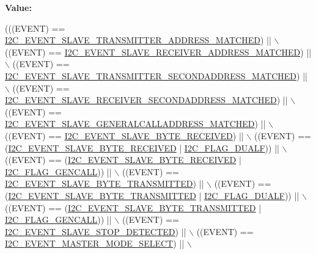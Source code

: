 {\bfseries Value\+:}
\begin{DoxyCode}
(((EVENT) == \hyperlink{group___i2_c___events_ga3fa381c1fd9a95c8ae13c6cc402b1327}{I2C\_EVENT\_SLAVE\_TRANSMITTER\_ADDRESS\_MATCHED}) || \(\backslash\)
                             ((EVENT) == 
      \hyperlink{group___i2_c___events_ga6cf0e334704618b024eee604849f50f7}{I2C\_EVENT\_SLAVE\_RECEIVER\_ADDRESS\_MATCHED}) || \(\backslash\)
                             ((EVENT) == 
      \hyperlink{group___i2_c___events_ga6221aa204356bec9146f800ccfc99fc1}{I2C\_EVENT\_SLAVE\_TRANSMITTER\_SECONDADDRESS\_MATCHED}) || \(\backslash\)
                             ((EVENT) == 
      \hyperlink{group___i2_c___events_ga17e78ab01fa980b3df10f8d9f6864c48}{I2C\_EVENT\_SLAVE\_RECEIVER\_SECONDADDRESS\_MATCHED}) || \(\backslash\)
                             ((EVENT) == 
      \hyperlink{group___i2_c___events_ga15195f6def95f688ae9725899f49ea23}{I2C\_EVENT\_SLAVE\_GENERALCALLADDRESS\_MATCHED}) || \(\backslash\)
                             ((EVENT) == \hyperlink{group___i2_c___events_ga8b244626839940569c6c8bbfc4efe21d}{I2C\_EVENT\_SLAVE\_BYTE\_RECEIVED}) || \(\backslash\)
                             ((EVENT) == (\hyperlink{group___i2_c___events_ga8b244626839940569c6c8bbfc4efe21d}{I2C\_EVENT\_SLAVE\_BYTE\_RECEIVED} | 
      \hyperlink{group___i2_c__flags__definition_ga3755b783aa73568659478c2e2e45e27f}{I2C\_FLAG\_DUALF})) || \(\backslash\)
                             ((EVENT) == (\hyperlink{group___i2_c___events_ga8b244626839940569c6c8bbfc4efe21d}{I2C\_EVENT\_SLAVE\_BYTE\_RECEIVED} | 
      \hyperlink{group___i2_c__flags__definition_gab3a93b6840ad406c2fc09e0e96c59b88}{I2C\_FLAG\_GENCALL})) || \(\backslash\)
                             ((EVENT) == \hyperlink{group___i2_c___events_ga50652880323b8c2746b5afbdfea03fe1}{I2C\_EVENT\_SLAVE\_BYTE\_TRANSMITTED}) 
      || \(\backslash\)
                             ((EVENT) == (\hyperlink{group___i2_c___events_ga50652880323b8c2746b5afbdfea03fe1}{I2C\_EVENT\_SLAVE\_BYTE\_TRANSMITTED} 
      | \hyperlink{group___i2_c__flags__definition_ga3755b783aa73568659478c2e2e45e27f}{I2C\_FLAG\_DUALF})) || \(\backslash\)
                             ((EVENT) == (\hyperlink{group___i2_c___events_ga50652880323b8c2746b5afbdfea03fe1}{I2C\_EVENT\_SLAVE\_BYTE\_TRANSMITTED} 
      | \hyperlink{group___i2_c__flags__definition_gab3a93b6840ad406c2fc09e0e96c59b88}{I2C\_FLAG\_GENCALL})) || \(\backslash\)
                             ((EVENT) == \hyperlink{group___i2_c___events_ga3148d8d7087e418959bc31e2646b2941}{I2C\_EVENT\_SLAVE\_STOP\_DETECTED}) || \(\backslash\)
                             ((EVENT) == \hyperlink{group___i2_c___events_gaeef8c22ac035122b06e31b360ac7aeb3}{I2C\_EVENT\_MASTER\_MODE\_SELECT}) || \(\backslash\)

\end{DoxyCode}
